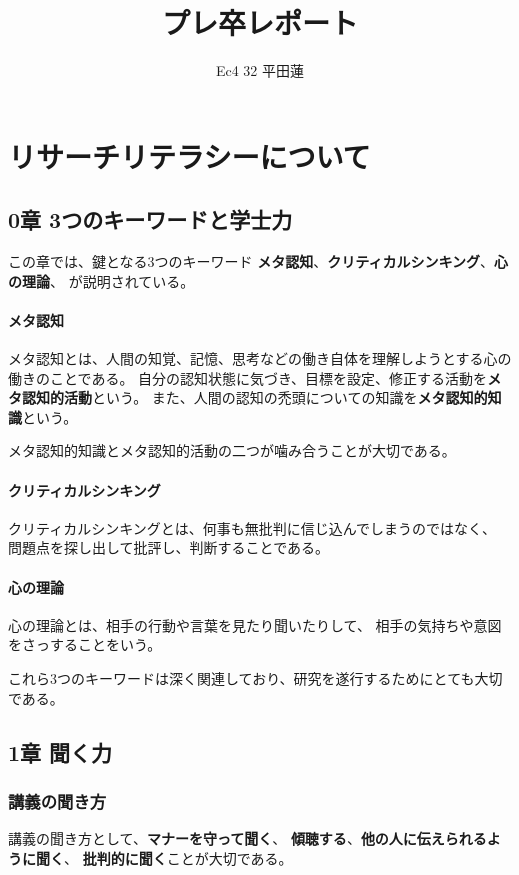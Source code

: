 \documentclass[]{jsarticle}
\title{プレ卒レポート}
\author{Ec4 32 平田蓮}
\date{}
\begin{document}
\maketitle
\section{リサーチリテラシーについて}
    \subsection{0章 3つのキーワードと学士力}
        この章では、鍵となる3つのキーワード
        {\bf メタ認知}、{\bf クリティカルシンキング}、{\bf 心の理論}、
        が説明されている。

        \paragraph{メタ認知}
            メタ認知とは、人間の知覚、記憶、思考などの働き自体を理解しようとする心の働きのことである。
            自分の認知状態に気づき、目標を設定、修正する活動を{\bf メタ認知的活動}という。
            また、人間の認知の禿頭についての知識を{\bf メタ認知的知識}という。

            メタ認知的知識とメタ認知的活動の二つが噛み合うことが大切である。

        \paragraph{クリティカルシンキング}
            クリティカルシンキングとは、何事も無批判に信じ込んでしまうのではなく、
            問題点を探し出して批評し、判断することである。

        \paragraph{心の理論}
            心の理論とは、相手の行動や言葉を見たり聞いたりして、
            相手の気持ちや意図をさっすることをいう。

        これら3つのキーワードは深く関連しており、研究を遂行するためにとても大切である。

    \subsection{1章 聞く力}
        \subsubsection*{講義の聞き方}
            講義の聞き方として、{\bf マナーを守って聞く}、
            {\bf 傾聴する}、{\bf 他の人に伝えられるように聞く}、
            {\bf 批判的に聞く}ことが大切である。
\end{document}
